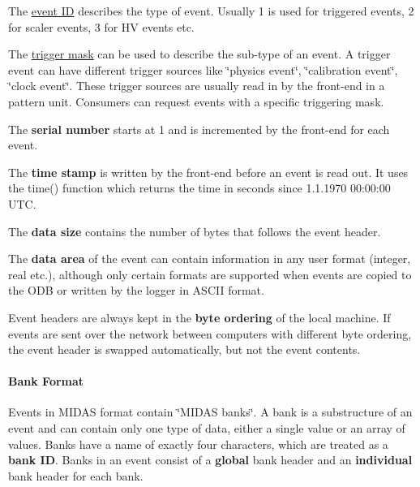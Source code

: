 \begin{DoxyItemize}
\item The \hyperlink{FE_table_FE_tbl_EventID}{event ID} describes the type of event. Usually 1 is used for triggered events, 2 for scaler events, 3 for HV events etc.
\item The \hyperlink{FE_table_FE_tbl_TrigMask}{trigger mask} can be used to describe the sub-\/type of an event. A trigger event can have different trigger sources like \char`\"{}physics event\char`\"{}, \char`\"{}calibration event\char`\"{}, \char`\"{}clock event\char`\"{}. These trigger sources are usually read in by the front-\/end in a pattern unit. Consumers can request events with a specific triggering mask.
\item The {\bfseries serial number} starts at 1 and is incremented by the front-\/end for each event.
\item The {\bfseries time stamp} is written by the front-\/end before an event is read out. It uses the time() function which returns the time in seconds since 1.1.1970 00:00:00 UTC.
\item The {\bfseries data size} contains the number of bytes that follows the event header.
\item The {\bfseries data area} of the event can contain information in any user format (integer, real etc.), although only certain formats are supported when events are copied to the ODB or written by the logger in ASCII format.
\end{DoxyItemize}

\label{FE_Data_format_idx_byte-ordering}
\hypertarget{FE_Data_format_idx_byte-ordering}{}
 Event headers are always kept in the {\bfseries byte ordering} of the local machine. If events are sent over the network between computers with different byte ordering, the event header is swapped automatically, but not the event contents.\hypertarget{FE_Data_format_FE_Bank_Format}{}\paragraph{Bank Format}\label{FE_Data_format_FE_Bank_Format}
Events in MIDAS format contain \char`\"{}MIDAS banks\char`\"{}. A bank is a substructure of an event and can contain only one type of data, either a single value or an array of values. Banks have a name of exactly four characters, which are treated as a {\bfseries bank ID}. Banks in an event consist of a {\bfseries global} bank header and an {\bfseries individual} bank header for each bank.

